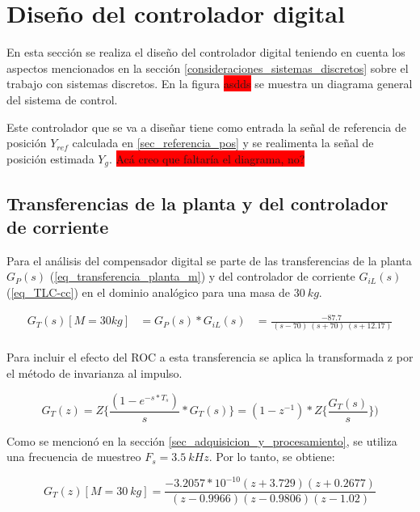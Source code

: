 \section{Diseño del controlador digital}

En esta sección se realiza el diseño del controlador digital teniendo en cuenta los aspectos mencionados en la sección  \ref{consideraciones_sistemas_discretos} sobre el trabajo con sistemas discretos. En la figura \colorbox{red}{asdds} se muestra un diagrama general del sistema de control.

Este controlador que se va a diseñar tiene como entrada la señal de referencia de posición $Y_{ref}$ calculada en \ref{sec_referencia_pos} y se realimenta la señal de posición estimada $Y_g$.
\colorbox{red}{Acá creo que faltaría el diagrama, no?}


\subsection{Transferencias de la planta y del controlador de corriente}

 Para el análisis del compensador digital se parte de las transferencias de la planta $G_P(s)$ (\ref{eq_transferencia_planta_m}) y del controlador de corriente $G_{iL}(s) $ (\ref{eq_TLC-cc}) en el dominio analógico para una masa de $30 \:kg$.

\begin{equation} 
	\begin{aligned}
		G_T(s)[M=30kg]&=G_P(s)*G_{iL}(s)&=\frac{-87.7}{\ (s-70)\ (s+70)\ (s+12.17)}\\
	\end{aligned}
\end{equation}



Para incluir el efecto del ROC a esta transferencia se aplica la transformada z por el método de invarianza al impulso. 

\begin{equation*}
	G_T(z)=Z\{\frac{(1-e^{-s*T_s})}{s}*G_T(s)\}=(1-z^{-1})*Z\{\frac{G_T(s)}{s}\})
\end{equation*}

 Como se mencionó en la sección \ref{sec_adquisicion_y_procesamiento}, se utiliza una frecuencia de muestreo  $F_s=3.5\:kHz$. Por lo tanto, se obtiene:

\begin{equation} 
	G_T(z)[M=30\:kg] =\frac{-3.2057*10^{-10}(z+3.729)(z+0.2677)}{(z-0.9966)(z-0.9806) (z-1.02)}
\end{equation}

